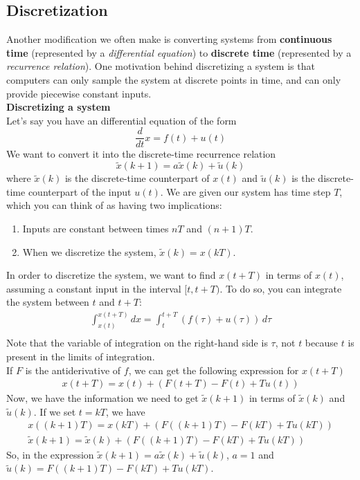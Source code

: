 \subsection*{Discretization}
Another modification we often make is converting systems from \textbf{continuous time} (represented by a \textit{differential equation}) to \textbf{discrete time} (represented by a \textit{recurrence relation}).
One motivation behind discretizing a system is that computers can only sample the system at discrete points in time, and can only provide piecewise constant inputs. \\
\newline
\textbf{Discretizing a system} \\
\newline
Let's say you have an differential equation of the form
$$\frac{d}{dt} x = f(t) + u(t)$$
We want to convert it into the discrete-time recurrence relation
$$\tilde{x}(k + 1) = a\tilde{x}(k) + \tilde{u}(k)$$
where $\tilde{x}(k)$ is the discrete-time counterpart of $x(t)$ and $\tilde{u}(k)$ is the discrete-time counterpart of the input $u(t)$.
\newline
We are given our system has time step $T$, which you can think of as having two implications:
\begin{enumerate}
    \item Inputs are constant between times $nT$ and $(n + 1)T$.
    \item When we discretize the system, $\tilde{x}(k) = x(kT)$.
\end{enumerate}
In order to discretize the system, we want to find $x(t + T)$ in terms of $x(t)$, assuming a constant input in the interval $[t, t + T)$.
To do so, you can integrate the system between $t$ and $t + T$:
\begin{align*}
    \int_{x(t)}^{x(t + T)} dx = \int_t^{t + T} (f(\tau) + u(\tau)) \, d\tau \\
\end{align*}
Note that the variable of integration on the right-hand side is $\tau$, not $t$ because $t$ is present in the limits of integration. \\
If $F$ is the antiderivative of $f$, we can get the following expression for $x(t + T)$
\begin{align*}
    x(t + T) = x(t) + (F(t + T) - F(t) + Tu(t))
\end{align*}
Now, we have the information we need to get $\tilde{x}(k + 1)$ in terms of $\tilde{x}(k)$ and $\tilde{u}(k)$. 
If we set $t = kT$, we have
\begin{align*}
    x((k + 1)T) = x(kT) + (F((k + 1)T) - F(kT) + Tu(kT)) \\
    \boxed{\tilde{x}(k + 1) = \tilde{x}(k) + (F((k + 1)T) - F(kT) + Tu(kT))}
\end{align*}
So, in the expression $\tilde{x}(k + 1) = a\tilde{x}(k) + \tilde{u}(k)$, $a = 1$ and $\tilde{u}(k) = F((k + 1)T) - F(kT) + Tu(kT)$.

